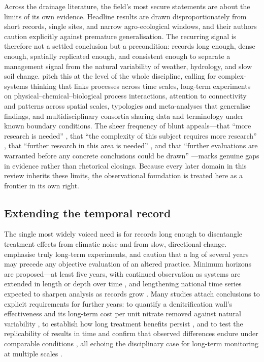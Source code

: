 Across the drainage literature, the field's most secure statements are
about the limits of its own evidence. Headline results are drawn
disproportionately from short records, single sites, and narrow
agro-ecological windows, and their authors caution explicitly against
premature generalisation. The recurring signal is therefore not a settled
conclusion but a precondition: records long enough, dense enough,
spatially replicated enough, and consistent enough to separate a
management signal from the natural variability of weather, hydrology, and
slow soil change. \textcite{Rogger2017} pitch this at the level of the
whole discipline, calling for complex-systems thinking that links
processes across time scales, long-term experiments on
physical--chemical--biological process interactions, attention to
connectivity and patterns across spatial scales, typologies and
meta-analyses that generalise findings, and multidisciplinary consortia
sharing data and terminology under known boundary conditions. The sheer
frequency of blunt appeals---that ``more research is needed''
\parencite{SHALIT1995}, that ``the complexity of this subject requires more
research'' \parencite{Malone2014}, that ``further research in this area is
needed'' \parencite{Woo2023}, and that ``further evaluations are warranted
before any concrete conclusions could be drawn''
\parencite{GUPTA1993}---marks genuine gaps in evidence rather than
rhetorical closings. Because every later domain in this review inherits
these limits, the observational foundation is treated here as a frontier
in its own right.

\subsection{Extending the temporal record}

The single most widely voiced need is for records long enough to
disentangle treatment effects from climatic noise and from slow,
directional change. \textcite{Clifford2023} emphasise truly long-term
experiments, and \textcite{BUHLER1993} caution that a lag of several years
may precede any objective evaluation of an altered practice. Minimum
horizons are proposed---at least five years, with continued observation as
systems are extended in length or depth over time \parencite{Ali2013}, and
lengthening national time series expected to sharpen analysis as records
grow \parencite{Ali2001}. Many studies attach conclusions to explicit
requirements for further years: to quantify a denitrification wall's
effectiveness and its long-term cost per unit nitrate removed against
natural variability \parencite{Jaynes2008}, to establish how long treatment
benefits persist \parencite{Dalhem2019,Osterholm2005}, and to test the
replicability of results in time and confirm that observed differences
endure under comparable conditions
\parencite{ROLLIN1987,Reinhart2020,Rijal2012,GiménezValero2025}, all
echoing the disciplinary case for long-term monitoring at multiple scales
\parencite{SPALING1995}.

